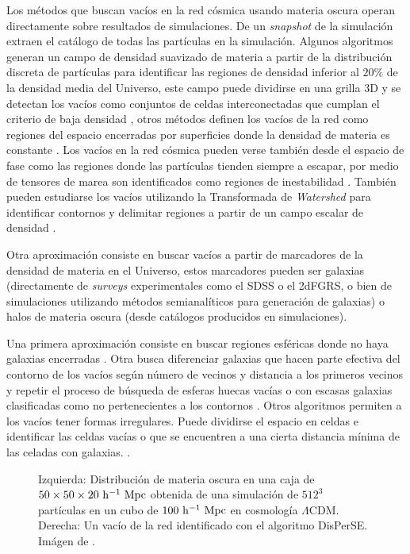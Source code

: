 \documentclass[preprint]{aastex62}
\begin{document}
  Los métodos que buscan vacíos en la red cósmica usando materia oscura operan directamente sobre
  resultados de simulaciones. De un \textit{snapshot} de la simulación extraen el catálogo de todas
  las partículas en la simulación. Algunos algoritmos generan un campo de densidad suavizado de
  materia a partir de la distribución discreta de partículas para identificar las regiones de
  densidad inferior al $20\%$ de la densidad media del Universo\citep{Ref_Aspen-Amsterdam2008},
  este campo puede dividirse en una grilla 3D y se detectan los vacíos como conjuntos de celdas
  interconectadas que cumplan el criterio de baja densidad \citep{Ref_Aspen-Amsterdam2008},
  otros métodos definen los vacíos de la red como regiones del espacio encerradas por superficies
  donde la densidad de materia es constante \citep{Ref_Aspen-Amsterdam2008}.
  Los vacíos en la red cósmica pueden verse también desde el espacio de fase como las regiones
  donde las partículas tienden siempre a escapar, por medio de tensores de marea son identificados
  como regiones de inestabilidad \citep{Ref_Aspen-Amsterdam2008}.
  También pueden estudiarse los vacíos utilizando la Transformada de \textit{Watershed} para
  identificar contornos y delimitar regiones a partir de un campo escalar de densidad
  \citep{Ref_Aspen-Amsterdam2008}.

  Otra aproximación consiste en buscar vacíos a partir de marcadores de la densidad de materia
  en el Universo, estos marcadores pueden ser galaxias (directamente de \textit{surveys} experimentales como el
  SDSS o el 2dFGRS, o bien de simulaciones utilizando métodos semianalíticos para generación de
  galaxias) o halos de materia oscura (desde catálogos producidos en simulaciones).

  Una primera aproximación consiste en buscar regiones esféricas donde no haya galaxias encerradas
  \citep{Ref_Aspen-Amsterdam2008}. Otra busca diferenciar galaxias que hacen parte efectiva del contorno
  de los vacíos según número de vecinos y distancia a los primeros vecinos y repetir el proceso de
  búsqueda de esferas huecas vacías o con escasas galaxias clasificadas como no pertenecientes a
  los contornos \citep{Ref_Aspen-Amsterdam2008}. Otros algoritmos permiten a los vacíos tener
  formas irregulares. Puede dividirse el espacio en celdas e identificar las celdas vacías o que
  se encuentren a una cierta distancia mínima de las celadas con galaxias. \citep{Ref_Aspen-Amsterdam2008}.

  \begin{figure}
    \caption{ Izquierda: Distribución de materia oscura en una caja de
      $50 \times 50 \times 20 \rm~h^{-1}~Mpc$ obtenida de una simulación de $512^3$ partículas
      en un cubo de $100\rm~ h^{-1} ~ Mpc$ en cosmología $\Lambda$CDM. Derecha: Un vacío de la
      red identificado con el algoritmo DisPerSE. Imágen de
      \citet{https://arxiv.org/pdf/1009.4014.pdf}. \label{fig:voids_in_simulations}}
  \end{figure}
\end{document}

